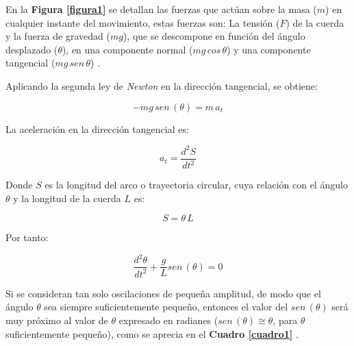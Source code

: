 \documentclass[letter,11pt]{article}
\begin{document}
En la \textbf{Figura \ref{figura1}} se detallan las fuerzas que actúan sobre la
masa ($m$) en cualquier instante del movimiento, estas fuerzas son: La tensión
($F$) de la cuerda y la fuerza de gravedad ($mg$), que se descompone en función
del ángulo desplazado ($\theta$), en una componente normal ($mg\, cos\, \theta$)
y una componente tangencial ($mg\, sen\, \theta$) \cite{GUIA}.

Aplicando la segunda ley de \emph{Newton} en la dirección tangencial, se
obtiene:

\begin{equation*}
    -mg\, sen\, (\theta) = m\, a_t
\label{segundaley}
\end{equation*}
\vspace{0.10cm}

La aceleración en la dirección tangencial es:

\begin{equation*}
    a_t = \frac{d^2 S}{dt^2}
\end{equation*}
\vspace{0.10cm}

Donde $S$ es la longitud del arco o trayectoria circular, cuya relación con el
ángulo $\theta$ y la longitud de la cuerda $L$ es:

\begin{equation*}
    S = \theta\, L
\end{equation*}
\vspace{0.10cm}

Por tanto:

\begin{equation*}
    \frac{d^2 \theta}{dt^2} + \frac{g}{L} sen\, (\theta) = 0
\end{equation*}
\vspace{0.10cm}

Si se consideran tan solo oscilaciones de pequeña amplitud, de modo que el
ángulo $\theta$ sea siempre suficientemente pequeño, entonces el valor del
$sen\, (\theta)$ será muy próximo al valor de $\theta$ expresado en radianes
($sen\, (\theta) \cong \theta$, para $\theta$ suficientemente pequeño), como
se aprecia en el \textbf{Cuadro \ref{cuadro1}} \cite{WIKI1}.
\end{document}
